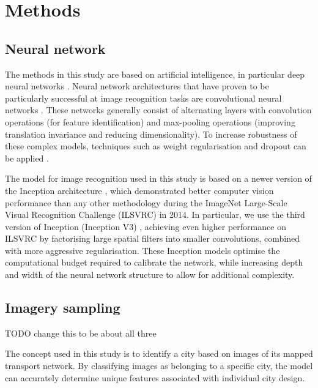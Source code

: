 \documentclass[sageh,times]{sagej}
\begin{document}
\section{Methods}\label{sec:methods}

\subsection{Neural network}\label{sec:methods1}














The methods in this study are based on artificial intelligence, in particular deep neural networks \citep{Bishop1995,Samarasinghe2016,Graupe2013}. Neural network architectures that have proven to be particularly successful at image recognition tasks are convolutional neural networks \citep{Schmidhuber2015}. These networks generally consist of alternating layers with convolution operations (for feature identification) and max-pooling operations (improving translation invariance and reducing dimensionality). To increase robustness of these complex models, techniques such as weight regularisation and dropout can be applied \citep{Srivastava2014}.

The model for image recognition used in this study is based on a newer version of the Inception architecture \citep{Szegedy2015}, which demonstrated better computer vision performance than any other methodology during the ImageNet Large-Scale Visual Recognition Challenge (ILSVRC) \citep{Russakovsky2015} in 2014. In particular, we use the third version of Inception (Inception V3) \citep{Szegedy2015a}, achieving even higher performance on ILSVRC by factorising large spatial filters into smaller convolutions, combined with more aggressive regularisation. These Inception models optimise the computational budget required to calibrate the network, while increasing depth and width of the neural network structure to allow for additional complexity.

\subsection{Imagery sampling}\label{sec:methods2}
TODO change this to be about all three

The concept used in this study is to identify a city based on images of its mapped transport network. By classifying images as belonging to a specific city, the model can accurately determine unique features associated with individual city design. 
\end{document}
